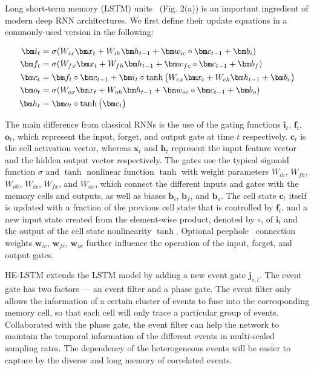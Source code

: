 \documentclass[letterpaper]{article} %
\begin{document}
    
Long short-term memory (LSTM) units~\cite{hochreiter1997long} (Fig. 2(a)) is an important ingredient of modern deep
RNN architectures. We first define their update equations in a commonly-used version in the following:

\begin{align}\label{grubegin}
\setlength{\abovedisplayskip}{3pt}
\bm i_t &= \sigma(W_{ix}\bm x_t+ W_{ih}\bm h_{t-1} + \bm w_{ic} \circ \bm c_{t-1}+ \bm b_i)\\
\bm f_t &= \sigma(W_{fx}\bm x_t+ W_{fh}\bm h_{t-1} + \bm w_{fc} \circ \bm c_{t-1} + \bm b_f)\\
\bm c_t &= \bm f_t \circ \bm c_{t-1} + \bm i_t \circ \tanh\big (W_{cx}\bm x_t+ W_{ch} \bm h_{t-1} + \bm b_c \big) \\
\bm o_t &= \sigma(W_{ox}\bm x_t+ W_{oh}\bm h_{t-1} + \bm w_{oc} \circ \bm c_{t-1} + \bm b_o)\\
\bm h_t &= \bm o_t \circ \tanh \big( \bm c_t \big)
\label{gruend}
\setlength{\belowdisplayskip}{3pt}
\end{align}

The main difference from classical RNNs is the use of the gating functions $\bm i_t$, $\bm f_t$, $\bm o_t$, which represent
the input, forget, and output gate at time $t$ respectively. $\bm c_t$ is the cell activation vector, whereas $\bm x_t$
and $\bm h_t$ represent the input feature vector and the hidden output vector respectively. 
The gates use the
typical sigmoid function $\sigma $ and $\tanh$ nonlinear function $\tanh$ with weight parameters
$W_{ih}$, $W_{fh}$, $W_{oh}$, $W_{ix}$, $W_{fx}$, and $W_{ox}$, which connect the different inputs and gates with the memory
cells and outputs, as well as biases $\bm b_i$, $\bm b_f$, and $\bm b_o$. The cell state $\bm c_t$ itself is updated with a fraction of the previous cell state that is controlled by $\bm f_t$, and a new input state created from the element-wise product, denoted by $\circ$, of $\bm i_t$ and the output of the cell state nonlinearity $\tanh$. Optional peephole~\cite{gers2000recurrent} connection weights $\bm w_{ic}$, $\bm w_{fc}$, $\bm w_{oc}$ further influence the operation of the input, forget,
and output gates.

HE-LSTM extends the LSTM model by adding a new event gate $\bm j_{s,t}$. 
 The event gate has two factors --- an event filter and a phase gate. The event filter only allows the information of a certain cluster of events to fuse into the corresponding memory cell, so that each cell will only trace a particular group of events. Collaborated with the phase gate, the event filter can help the network to maintain the temporal information of the different events in multi-scaled sampling rates. The dependency of the heterogeneous events will be easier to capture by the diverse and long memory of correlated events.
 
\end{document}
